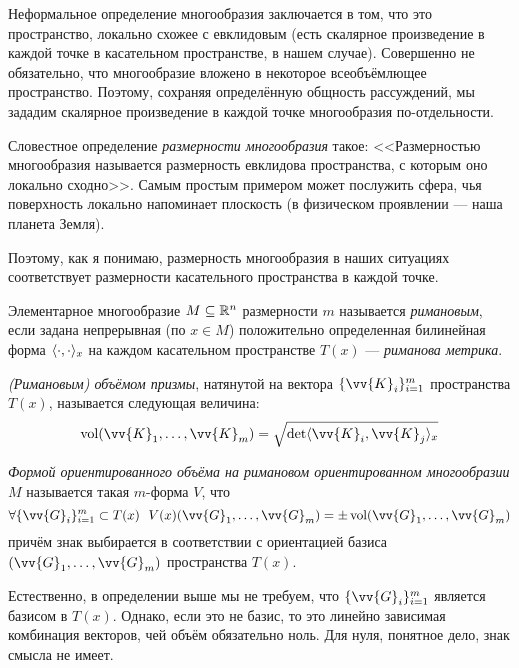 \begin{anote}
	Неформальное определение многообразия заключается в том, что это пространство, локально схожее с евклидовым (есть скалярное произведение в каждой точке в касательном пространстве, в нашем случае). Совершенно не обязательно, что многообразие вложено в некоторое всеобъёмлющее пространство. Поэтому, сохраняя определённую общность рассуждений, мы зададим скалярное произведение в каждой точке многообразия по-отдельности.
	
	Словестное определение \textit{размерности многообразия} такое: <<Размерностью многообразия называется размерность евклидова пространства, с которым оно локально сходно>>. Самым простым примером может послужить сфера, чья поверхность локально напоминает плоскость (в физическом проявлении --- наша планета Земля).
	
	Поэтому, как я понимаю, размерность многообразия в наших ситуациях соответствует размерности касательного пространства в каждой точке.
\end{anote}

\begin{definition}
	Элементарное многообразие $M \subseteq \mathbb{R}^n$ размерности $m$ называется \textit{римановым}, если задана непрерывная (по $x \in M$) положительно определенная билинейная форма $\langle\cdot, \cdot\rangle_x$ на каждом касательном пространстве $T(x)$ --- \textit{риманова метрика}.
\end{definition}

\begin{definition}
	\textit{(Римановым) объёмом призмы}, натянутой на вектора $\{\vv{K}_i\}_{i = 1}^m$ пространства $T(x)$, называется следующая величина:
	\[
		\vol(\vv{K}_1, \ldots, \vv{K}_m) = \sqrt{\det\ntbr{\vv{K}_i, \vv{K}_j}_x}
	\]
\end{definition}

\begin{definition}
	\textit{Формой ориентированного объёма на римановом ориентированном многообразии} $M$ называется такая $m$-форма $V$, что
	\[
		\forall \{\vv{G}_i\}_{i = 1}^m \subset T(x)\ \ V(x)(\vv{G}_1, \ldots, \vv{G}_m) = \pm \vol(\vv{G}_1, \ldots, \vv{G}_m)
	\]
	причём знак выбирается в соответствии с ориентацией базиса $(\vv{G}_1, \ldots, \vv{G}_m)$ пространства $T(x)$.
\end{definition}

\begin{anote}
	Естественно, в определении выше мы не требуем, что $\{\vv{G}_i\}_{i = 1}^m$ является базисом в $T(x)$. Однако, если это не базис, то это линейно зависимая комбинация векторов, чей объём обязательно ноль. Для нуля, понятное дело, знак смысла не имеет.
\end{anote}

